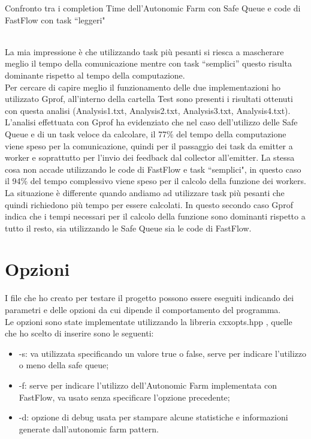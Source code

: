 \documentclass[12pt]{report}
\begin{document}
\begin{itemize}
\begin{table}[H]
    \caption{\label{tab:TableTaskLeggero} Confronto tra i completion Time dell'Autonomic Farm con Safe Queue e code di FastFlow con task ``leggeri"}
    \end{table}
\end{itemize}\\La mia impressione è che utilizzando task più pesanti si riesca a mascherare meglio il tempo della comunicazione mentre con task ``semplici'' questo risulta dominante rispetto al tempo della computazione.\\Per cercare di capire meglio il funzionamento delle due implementazioni ho utilizzato Gprof, all'interno della cartella Test sono presenti i risultati ottenuti con questa analisi (Analysis1.txt, Analysis2.txt, Analysis3.txt, Analysis4.txt).
L'analisi effettuata con Gprof ha evidenziato che nel caso dell'utilizzo delle Safe Queue e di un task veloce da calcolare, il 77\% del tempo della computazione viene speso per la comunicazione, quindi per il passaggio dei task da emitter a worker e soprattutto per l'invio dei feedback dal collector all'emitter.
La stessa cosa non accade utilizzando le code di FastFlow e  task ``semplici", in questo caso il 94\% del tempo complessivo viene speso per il calcolo della funzione dei workers.
La situazione è differente quando andiamo ad utilizzare task più pesanti che quindi richiedono più tempo per essere calcolati. In questo secondo caso Gprof indica che i tempi necessari per il calcolo della funzione sono dominanti rispetto a tutto il resto, sia utilizzando le Safe Queue sia le code di FastFlow.

\section{Opzioni}

I file che ho creato per testare il progetto possono essere eseguiti indicando dei parametri e delle opzioni da cui dipende il comportamento del programma.\\Le opzioni sono state implementate utilizzando la libreria cxxopts.hpp \cite{cxxopts}, quelle che ho scelto di inserire sono le seguenti:

\begin{itemize}
\item -s: va utilizzata specificando un valore true o false, serve per indicare l'utilizzo o meno della safe queue;
\item -f: serve per indicare l'utilizzo dell'Autonomic Farm implementata con FastFlow, va usato senza specificare l'opzione precedente;
\item -d: opzione di debug usata per stampare alcune statistiche e informazioni generate dall'autonomic farm pattern.
\end{itemize}
\end{document}
